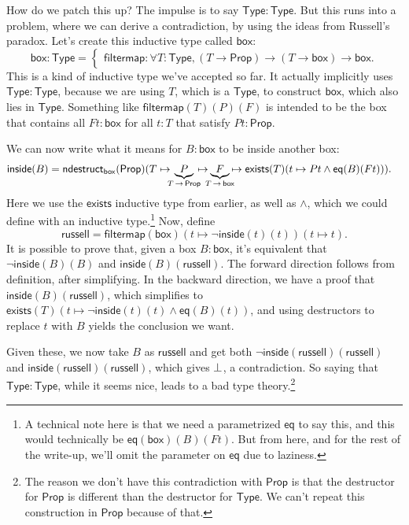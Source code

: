 \documentclass[11pt,paper=letter]{scrartcl}
\renewcommand{\sf}{\mathsf}
\renewcommand{\land}{\wedge}
\renewcommand{\lnot}{\neg}
\newcommand{\prop}{\mathsf{Prop}}
\newcommand{\type}{\mathsf{Type}}
\newcommand{\sto}{\,\to\,}
\begin{document}
How do we patch this up? The impulse is to say $\type : \type$. But this runs into a problem, where we can derive a contradiction, by using the ideas from Russell's paradox. Let's create this inductive type called $\sf{box}$: \[
  \sf{box}: \type =
  \begin{cases}
  \sf{filtermap}: \forall T: \type, (T \to \prop) \to (T \to \sf{box}) \to \sf{box}.
  \end{cases}
\]
This is a kind of inductive type we've accepted so far. It actually implicitly uses $\type : \type$, because we are using $T$, which is a $\type$, to construct $\sf{box}$, which also lies in $\type$. Something like $\sf{filtermap}(T)(P)(F)$ is intended to be the box that contains all $Ft : \sf{box}$ for all $t : T$ that satisfy $Pt : \prop$.

We can now write what it means for $B : \sf{box}$ to be inside another box:
\begin{align*}
\sf{inside}(B) &=\sf{ndestruct}_{\sf{box}}(\prop)(
  T \mapsto
  \mkern-10mu
  \underbrace{P}_{T\sto \prop}
  \mkern-10mu
  \mapsto
  \mkern-10mu
  \underbrace{F}_{T\sto \sf{box}}
  \mkern-10mu
  \mapsto
  \sf{exists}(T)(t \mapsto Pt \land \sf{eq}(B)(Ft))
  ).
\end{align*}
Here we use the $\sf{exists}$ inductive type from earlier, as well as $\land$, which we could define with an inductive type.\footnote{A technical note here is that we need a parametrized $\sf{eq}$ to say this, and this would technically be $\sf{eq}(\sf{box})(B)(Ft)$. But from here, and for the rest of the write-up, we'll omit the parameter on $\sf{eq}$ due to laziness.} Now, define \[
  \sf{russell} = \sf{filtermap}(\sf{box})(t \mapsto \lnot \sf{inside}(t)(t))(t \mapsto t).
\]
It is possible to prove that, given a box $B : \sf{box}$, it's equivalent that $\lnot \sf{inside}(B)(B)$ and $\sf{inside}(B)(\sf{russell})$. The forward direction follows from definition, after simplifying. In the backward direction, we have a proof that $\sf{inside}(B)(\sf{russell})$, which simplifies to $\sf{exists}(T)(t \mapsto \lnot\sf{inside}(t)(t) \land \sf{eq}(B)(t))$, and using destructors to replace $t$ with $B$ yields the conclusion we want.

Given these, we now take $B$ as $\sf{russell}$ and get both $\lnot \sf{inside}(\sf{russell})(\sf{russell})$ and $\sf{inside}(\sf{russell})(\sf{russell})$, which gives $\bot$, a contradiction. So saying that $\type : \type$, while it seems nice, leads to a bad type theory.\footnote{The reason we don't have this contradiction with $\prop$ is that the destructor for $\prop$ is different than the destructor for $\type$. We can't repeat this construction in $\prop$ because of that.}
\end{document}
